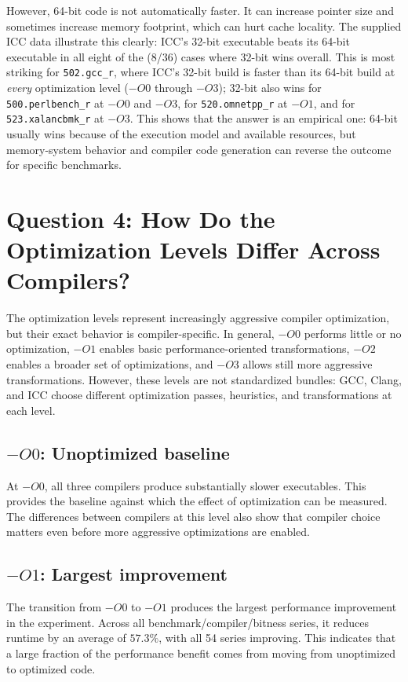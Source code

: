\documentclass[11pt,a4paper]{article}
\newcommand{\bench}[1]{\texttt{#1}}
\begin{document}
However, 64-bit code is not automatically faster. It can increase pointer size and sometimes increase memory footprint, which can hurt cache locality. The supplied ICC data illustrate this clearly: ICC's 32-bit executable beats its 64-bit executable in all eight of the (8/36) cases where 32-bit wins overall. This is most striking for \bench{502.gcc\_r}, where ICC's 32-bit build is faster than its 64-bit build at \emph{every} optimization level ($-O0$ through $-O3$); 32-bit also wins for \bench{500.perlbench\_r} at $-O0$ and $-O3$, for \bench{520.omnetpp\_r} at $-O1$, and for \bench{523.xalancbmk\_r} at $-O3$. This shows that the answer is an empirical one: 64-bit usually wins because of the execution model and available resources, but memory-system behavior and compiler code generation can reverse the outcome for specific benchmarks.

\section{Question 4: How Do the Optimization Levels Differ Across Compilers?}

The optimization levels represent increasingly aggressive compiler
optimization, but their exact behavior is compiler-specific. In general,
$-O0$ performs little or no optimization, $-O1$ enables basic
performance-oriented transformations, $-O2$ enables a broader set of
optimizations, and $-O3$ allows still more aggressive transformations.
However, these levels are not standardized bundles: GCC, Clang, and ICC
choose different optimization passes, heuristics, and transformations at
each level.

\subsection{$-O0$: Unoptimized baseline}

At $-O0$, all three compilers produce substantially slower executables.
This provides the baseline against which the effect of optimization can be
measured. The differences between compilers at this level also show that
compiler choice matters even before more aggressive optimizations are
enabled.

\subsection{$-O1$: Largest improvement}

The transition from $-O0$ to $-O1$ produces the largest performance
improvement in the experiment. Across all benchmark/compiler/bitness
series, it reduces runtime by an average of $57.3\%$, with all 54 series
improving. This indicates that a large fraction of the performance benefit
comes from moving from unoptimized to optimized code.
\end{document}
